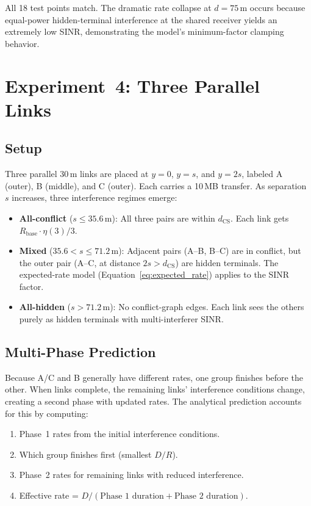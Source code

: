 \documentclass[11pt,a4paper]{article}
\begin{document}
All 18 test points match. The dramatic rate collapse at $d=75\,$m occurs because equal-power hidden-terminal interference at the shared receiver yields an extremely low SINR, demonstrating the model's minimum-factor clamping behavior.

\section{Experiment~4: Three Parallel Links}
\label{sec:exp4}

\subsection{Setup}
Three parallel 30\,m links are placed at $y = 0$, $y = s$, and $y = 2s$, labeled A (outer), B (middle), and C (outer). Each carries a 10\,MB transfer. As separation~$s$ increases, three interference regimes emerge:

\begin{itemize}
    \item \textbf{All-conflict} ($s \leq 35.6\,$m): All three pairs are within $d_{\text{CS}}$. Each link gets $R_{\text{base}} \cdot \eta(3)/3$.
    \item \textbf{Mixed} ($35.6 < s \leq 71.2\,$m): Adjacent pairs (A--B, B--C) are in conflict, but the outer pair (A--C, at distance $2s > d_{\text{CS}}$) are hidden terminals. The expected-rate model (Equation~\ref{eq:expected_rate}) applies to the SINR factor.
    \item \textbf{All-hidden} ($s > 71.2\,$m): No conflict-graph edges. Each link sees the others purely as hidden terminals with multi-interferer SINR.
\end{itemize}

\subsection{Multi-Phase Prediction}
Because A/C and B generally have different rates, one group finishes before the other. When links complete, the remaining links' interference conditions change, creating a second phase with updated rates. The analytical prediction accounts for this by computing:
\begin{enumerate}
    \item Phase~1 rates from the initial interference conditions.
    \item Which group finishes first (smallest $D/R$).
    \item Phase~2 rates for remaining links with reduced interference.
    \item Effective rate = $D / (\text{Phase~1 duration} + \text{Phase~2 duration})$.
\end{enumerate}
\end{document}
